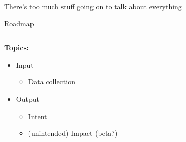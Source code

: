 \documentclass[main]{subfiles}
\begin{document}
\begin{frame}[standout]
    
  There's too much stuff going on to talk about everything

\end{frame}


\begin{frame}[plain]{}
\Large\centering\bfseries\scshape
  \visible<+->{}
  

\end{frame}

\begin{frame}{Roadmap}

\begin{columns}
\begin{column}{0.5\textwidth}

{\large \bfseries Topics:}

    \begin{itemize}
      \item Input
      \begin{itemize}
        \item Data collection
      \end{itemize}
      \item Output
        \begin{itemize}
          \item Intent
          \item (unintended) Impact (beta?)
        \end{itemize}
      
    \end{itemize}


\end{column}
\begin{column}{0.5\textwidth}


\end{column}
\end{columns}



\end{frame}
\end{document}
